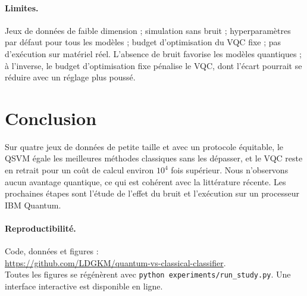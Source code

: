 \documentclass[10pt,a4paper,twocolumn]{article}
\begin{document}
\paragraph{Limites.}
Jeux de données de faible dimension ; simulation sans bruit ; hyperparamètres par défaut pour
tous les modèles ; budget d'optimisation du VQC fixe ; pas d'exécution sur matériel réel.
L'absence de bruit favorise les modèles quantiques ; à l'inverse, le budget d'optimisation fixe
pénalise le VQC, dont l'écart pourrait se réduire avec un réglage plus poussé.

\section{Conclusion}

Sur quatre jeux de données de petite taille et avec un protocole équitable, le QSVM égale les
meilleures méthodes classiques sans les dépasser, et le VQC reste en retrait pour un coût de
calcul environ $10^4$ fois supérieur. Nous n'observons aucun avantage quantique, ce qui est
cohérent avec la littérature récente. Les prochaines étapes sont l'étude de l'effet du bruit et
l'exécution sur un processeur IBM Quantum.

\paragraph{Reproductibilité.}
{\raggedright Code, données et figures :\\ \url{https://github.com/LDGKM/quantum-vs-classical-classifier}.\\
Toutes les figures se régénèrent avec \texttt{python experiments/run\_study.py}.
Une interface interactive est disponible en ligne.\par}
\end{document}
